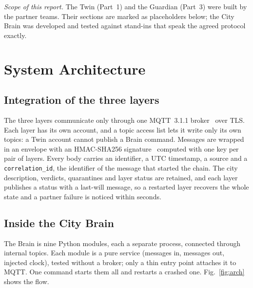 \documentclass[conference]{IEEEtran}
\newcommand{\code}[1]{\texttt{\small #1}}
\begin{document}
\emph{Scope of this report.} The Twin (Part~1) and the Guardian (Part~3) were built by the partner
teams. Their sections are marked as placeholders below; the City Brain was developed and tested against
stand-ins that speak the agreed protocol exactly.

\section{System Architecture}
\subsection{Integration of the three layers}
The three layers communicate only through one MQTT~3.1.1 broker~\cite{mqtt} over TLS. Each layer has its
own account, and a topic access list lets it write only its own topics: a Twin account cannot publish a
Brain command. Messages are wrapped in an envelope with an HMAC-SHA256 signature~\cite{hmac} computed with one
key per pair of layers. Every body carries an identifier, a UTC timestamp, a source and a
\code{correlation\_id}, the identifier of the message that started the chain. The city description,
verdicts, quarantines and layer status are retained, and each layer publishes a status with a last-will
message, so a restarted layer recovers the whole state and a partner failure is noticed within seconds.

\subsection{Inside the City Brain}
The Brain is nine Python modules, each a separate process, connected through internal topics. Each module
is a pure service (messages in, messages out, injected clock), tested without a broker; only a thin entry
point attaches it to MQTT. One command starts them all and restarts a crashed one. Fig.~\ref{fig:arch}
shows the flow.
\end{document}
